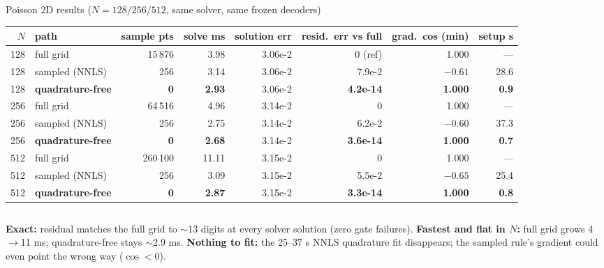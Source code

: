 \documentclass[10pt,aspectratio=169]{beamer}
\begin{document}
\begin{frame}{Poisson 2D results ($N=128/256/512$, same solver, same frozen decoders)}
  \centering\scriptsize
  \begin{tabular}{@{}rlrrrrrr@{}}
    \toprule
    $N$ & path & sample pts & solve ms & solution err & resid.\ err vs full & grad.\ cos (min) & setup s\\
    \midrule
    128 & full grid & 15\,876 & 3.98 & 3.06e-2 & 0 (ref) & 1.000 & --- \\
    128 & sampled (NNLS) & 256 & 3.14 & 3.06e-2 & 7.9e-2 & $-0.61$ & 28.6 \\
    128 & \textbf{quadrature-free} & \textbf{0} & \textbf{2.93} & 3.06e-2 & \textbf{4.2e-14} & \textbf{1.000} & \textbf{0.9} \\
    \midrule
    256 & full grid & 64\,516 & 4.96 & 3.14e-2 & 0 & 1.000 & --- \\
    256 & sampled (NNLS) & 256 & 2.75 & 3.14e-2 & 6.2e-2 & $-0.60$ & 37.3 \\
    256 & \textbf{quadrature-free} & \textbf{0} & \textbf{2.68} & 3.14e-2 & \textbf{3.6e-14} & \textbf{1.000} & \textbf{0.7} \\
    \midrule
    512 & full grid & 260\,100 & 11.11 & 3.15e-2 & 0 & 1.000 & --- \\
    512 & sampled (NNLS) & 256 & 3.09 & 3.15e-2 & 5.5e-2 & $-0.65$ & 25.4 \\
    512 & \textbf{quadrature-free} & \textbf{0} & \textbf{2.87} & 3.15e-2 & \textbf{3.3e-14} & \textbf{1.000} & \textbf{0.8} \\
    \bottomrule
  \end{tabular}

  \vspace{3mm}
  \begin{columns}[T]
    \small
    \textbf{Exact:} residual matches the full grid to $\sim$13 digits at every solver solution (zero gate failures).
    \small
    \textbf{Fastest and flat in $N$:} full grid grows 4$\to$11 ms; quadrature-free stays $\sim$2.9 ms.
    \small
    \textbf{Nothing to fit:} the 25--37 s NNLS quadrature fit disappears; the sampled rule's gradient could even point the wrong way ($\cos<0$).
  \end{columns}
\end{frame}
\end{document}

